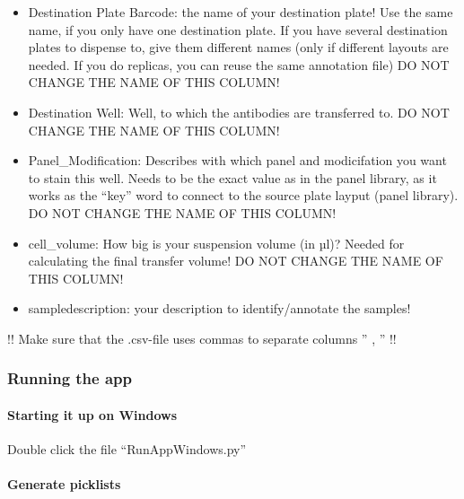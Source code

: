 \documentclass[
]{article}
\providecommand{\tightlist}{%
  \setlength{\itemsep}{0pt}\setlength{\parskip}{0pt}}
\begin{document}
\begin{itemize}
\tightlist
\item
  Destination Plate Barcode: the name of your destination plate! Use the
  same name, if you only have one destination plate. If you have several
  destination plates to dispense to, give them different names (only if
  different layouts are needed. If you do replicas, you can reuse the
  same annotation file) DO NOT CHANGE THE NAME OF THIS COLUMN!\\
\item
  Destination Well: Well, to which the antibodies are transferred to. DO
  NOT CHANGE THE NAME OF THIS COLUMN!\\
\item
  Panel\_Modification: Describes with which panel and modicifation you
  want to stain this well. Needs to be the exact value as in the panel
  library, as it works as the ``key'' word to connect to the source
  plate layput (panel library). DO NOT CHANGE THE NAME OF THIS COLUMN!\\
\item
  cell\_volume: How big is your suspension volume (in µl)? Needed for
  calculating the final transfer volume! DO NOT CHANGE THE NAME OF THIS
  COLUMN!\\
\item
  sampledescription: your description to identify/annotate the samples!
\end{itemize}

!! Make sure that the .csv-file uses commas to separate columns '' , ''
!!

\hypertarget{running-the-app}{%
\subsubsection{Running the app}\label{running-the-app}}

\hypertarget{starting-it-up-on-windows}{%
\paragraph{Starting it up on Windows}\label{starting-it-up-on-windows}}

Double click the file ``RunAppWindows.py''

\hypertarget{generate-picklists}{%
\paragraph{Generate picklists}\label{generate-picklists}}
\end{document}

